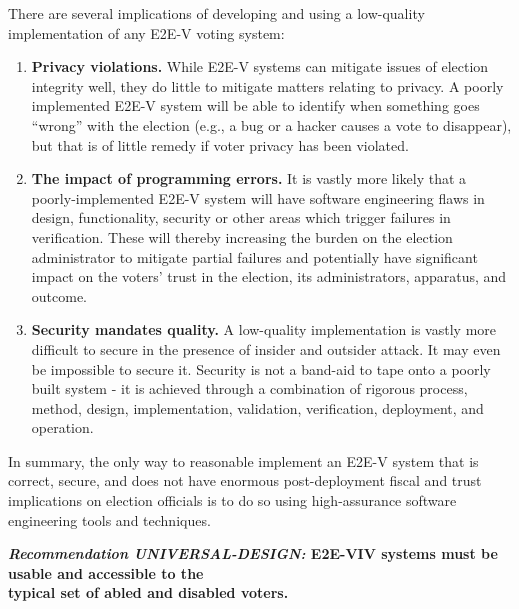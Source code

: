 There are several implications of developing and using a low-quality
implementation of any E2E-V voting system:
\begin{enumerate}
\item \textbf{Privacy violations.} While E2E-V systems can mitigate
  issues of election integrity well, they do little to mitigate
  matters relating to privacy. A poorly implemented E2E-V system will
  be able to identify when something goes ``wrong'' with the election
  (e.g., a bug or a hacker causes a vote to disappear), but that is of
  little remedy if voter privacy has been violated.
\item \textbf{The impact of programming errors.} It is vastly more
  likely that a poorly-implemented E2E-V system will have software
  engineering flaws in design, functionality, security or other areas
  which trigger failures in verification. These will thereby
  increasing the burden on the election administrator to mitigate
  partial failures and potentially have significant impact on the
  voters' trust in the election, its administrators, apparatus, and
  outcome.
\item \textbf{Security mandates quality.} A low-quality implementation
  is vastly more difficult to secure in the presence of insider and
  outsider attack. It may even be impossible to secure it. Security is
  not a band-aid to tape onto a poorly built system - it is achieved
  through a combination of rigorous process, method, design,
  implementation, validation, verification, deployment, and operation.
\end{enumerate}

In summary, the only way to reasonable implement an E2E-V system that
is correct, secure, and does not have enormous post-deployment fiscal
and trust implications on election officials is to do so using
high-assurance software engineering tools and techniques.
\begin{center}
  \textbf{\emph{Recommendation UNIVERSAL-DESIGN:} E2E-VIV systems must
    be usable and accessible to the\\
    typical set of abled and disabled voters.}
\end{center}

